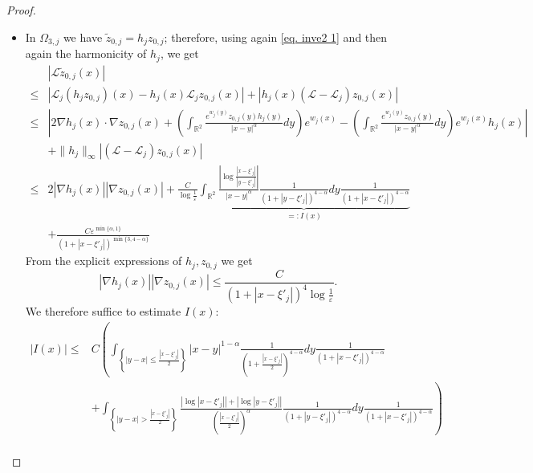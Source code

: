 \documentclass[11pt]{article}
\begin{document}
\begin{proof}
\begin{itemize}
\begin{equation}
\end{equation}
hence
\begin{align}
\nonumber|\mathcal L\widetilde z_{0,j}(x)|\le&|\mathcal L(\widetilde z_{0,j}-z_{0,j})(x)|+|\mathcal Lz_{0,j}(x)|\\
\nonumber\le&\frac C{\log\frac1\varepsilon}+\frac{C\varepsilon^{\min\{\alpha,1\}}}{\left(1+\left|x-\xi'_j\right|\right)^{\min\{3,4-\alpha\}}}\\
\label{ltildez0j2}\le&\frac C{\log\left(\frac1\varepsilon\right)\left(1+\left|x-\xi'_j\right|\right)^{\min\{3,4-\alpha\}}}.
\end{align}
\item In $\Omega_{3,j}$ we have $\widetilde z_{0,j}=h_jz_{0,j}$; therefore, using again \eqref{eq. inve2 1} and then again the harmonicity of $h_j$, we get
\begin{align*}
&|\mathcal L\widetilde z_{0,j}(x)|\\
\le&|\mathcal L_j(h_jz_{0,j})(x)-h_j(x)\mathcal L_jz_{0,j}(x)|+|h_j(x)(\mathcal L-\mathcal L_j)z_{0,j}(x)|\\
\le&\left|2\nabla h_j(x)\cdot\nabla z_{0,j}(x)+\left(\int_{\mathbb R^2}\frac{e^{w_j(y)}z_{0,j}(y)h_j(y)}{|x-y|^\alpha}dy\right)e^{w_j(x)}-\left(\int_{\mathbb R^2}\frac{e^{w_j(y)}z_{0,j}(y)}{|x-y|^\alpha}dy\right)e^{w_j(x)}h_j(x)\right|\\
&+\|h_j\|_\infty|(\mathcal L-\mathcal L_j)z_{0,j}(x)|\\
\le&2|\nabla h_j(x)||\nabla z_{0,j}(x)|+\frac C{\log\frac1\varepsilon}\underbrace{\int_{\mathbb R^2}\frac{\left|\log\frac{\left|x-\xi'_j\right|}{\left|y-\xi'_j\right|}\right|}{|x-y|^\alpha}\frac1{\left(1+\left|y-\xi'_j\right|\right)^{4-\alpha}}dy\frac1{\left(1+\left|x-\xi'_j\right|\right)^{4-\alpha}}}_{=:I(x)}\\
&+\frac{C\varepsilon^{\min\{\alpha,1\}}}{\left(1+\left|x-\xi'_j\right|\right)^{\min\{3,4-\alpha\}}}
\end{align*}
From the explicit expressions of $h_j,z_{0,j}$ we get
$$|\nabla h_j(x)||\nabla z_{0,j}(x)|\le\frac C{\left(1+\left|x-\xi'_j\right|\right)^4\log\frac1\varepsilon}.$$
We therefore suffice to estimate $I(x)$:
\begin{align*}
|I(x)|\le&C\left(\int_{\left\{|y-x|\le\frac{\left|x-\xi'_j\right|}2\right\}}|x-y|^{1-\alpha}\frac1{\left(1+\frac{\left|x-\xi'_j\right|}2\right)^{4-\alpha}}dy\frac1{\left(1+\left|x-\xi'_j\right|\right)^{4-\alpha}}\right.\\
&\left.+\int_{\left\{|y-x|>\frac{\left|x-\xi'_j\right|}2\right\}}\frac{\left|\log\left|x-\xi'_j\right|\right|+\left|\log\left|y-\xi'_j\right|\right|}{\left(\frac{\left|x-\xi'_j\right|}2\right)^\alpha}\frac1{\left(1+\left|y-\xi'_j\right|\right)^{4-\alpha}}dy\frac1{\left(1+\left|x-\xi'_j\right|\right)^{4-\alpha}}\right)\\

\end{align*}
\end{itemize}
\end{proof}
\end{document}
